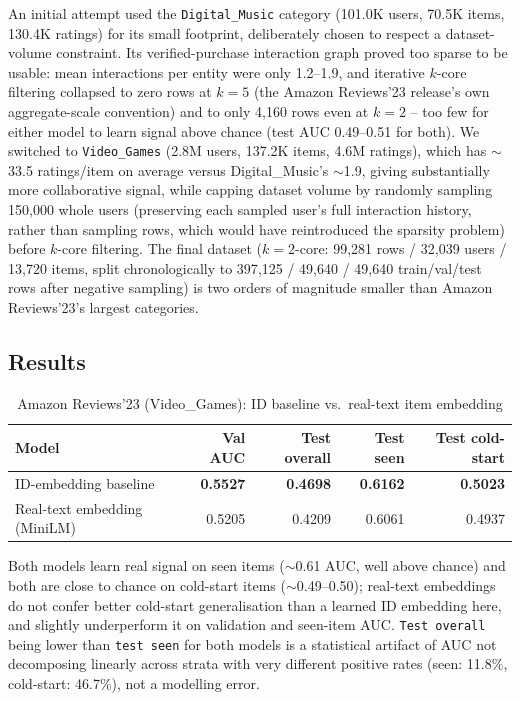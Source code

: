 An initial attempt used the \texttt{Digital\_Music} category (101.0K users, 70.5K items, 130.4K ratings) for its small footprint, deliberately chosen to respect a dataset-volume constraint. Its verified-purchase interaction graph proved too sparse to be usable: mean interactions per entity were only 1.2--1.9, and iterative $k$-core filtering collapsed to zero rows at $k=5$ (the Amazon Reviews'23 release's own aggregate-scale convention) and to only 4{,}160 rows even at $k=2$ -- too few for either model to learn signal above chance (test AUC 0.49--0.51 for both). We switched to \texttt{Video\_Games} (2.8M users, 137.2K items, 4.6M ratings), which has $\sim$33.5 ratings/item on average versus Digital\_Music's $\sim$1.9, giving substantially more collaborative signal, while capping dataset volume by randomly sampling 150{,}000 whole users (preserving each sampled user's full interaction history, rather than sampling rows, which would have reintroduced the sparsity problem) before $k$-core filtering. The final dataset ($k=2$-core: 99{,}281 rows / 32{,}039 users / 13{,}720 items, split chronologically to 397{,}125 / 49{,}640 / 49{,}640 train/val/test rows after negative sampling) is two orders of magnitude smaller than Amazon Reviews'23's largest categories.

\subsection{Results}

\begin{table}[h]
\centering
\caption{Amazon Reviews'23 (Video\_Games): ID baseline vs.\ real-text item embedding}
\label{tab:amazon-results}
\begin{tabular}{lrrrr}
\toprule
Model & Val AUC & Test overall & Test seen & Test cold-start \\
\midrule
ID-embedding baseline               & \textbf{0.5527} & \textbf{0.4698} & \textbf{0.6162} & \textbf{0.5023} \\
Real-text embedding (MiniLM)        & 0.5205 & 0.4209 & 0.6061 & 0.4937 \\
\bottomrule
\end{tabular}
\end{table}

Both models learn real signal on seen items ($\sim$0.61 AUC, well above chance) and both are close to chance on cold-start items ($\sim$0.49--0.50); real-text embeddings do not confer better cold-start generalisation than a learned ID embedding here, and slightly underperform it on validation and seen-item AUC. \texttt{Test overall} being lower than \texttt{test seen} for both models is a statistical artifact of AUC not decomposing linearly across strata with very different positive rates (seen: 11.8\%, cold-start: 46.7\%), not a modelling error.

